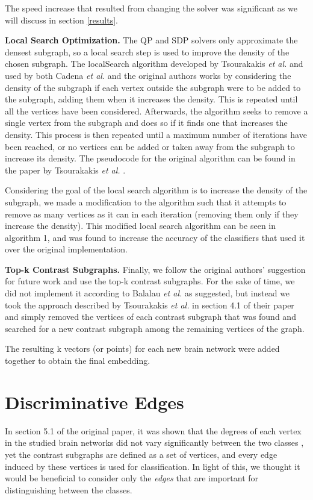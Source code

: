 \documentclass[letterpaper]{article}
\begin{document}
The speed increase that resulted from changing the solver was significant as we will discuss in section \ref{results}.

\textbf{Local Search Optimization.}
The QP and SDP solvers only approximate the densest subgraph, so a local search step is used to improve the density of the chosen subgraph.
The localSearch algorithm developed by Tsourakakis \emph{et al.} \cite{tsourakakis2013} and used by both Cadena \emph{et al.} and the original authors works by considering the density of the subgraph if each vertex outside the subgraph were to be added to the subgraph, adding them when it increases the density.
This is repeated until all the vertices have been considered.
Afterwards, the algorithm seeks to remove a single vertex from the subgraph and does so if it finds one that increases the density.
This process is then repeated until a maximum number of iterations have been reached, or no vertices can be added or taken away from the subgraph to increase its density.
The pseudocode for the original algorithm can be found in the paper by Tsourakakis \emph{et al.} \cite{tsourakakis2013}.

Considering the goal of the local search algorithm is to increase the density of the subgraph, we made a modification to the algorithm such that it attempts to remove as many vertices as it can in each iteration (removing them only if they increase the density).
This modified local search algorithm can be seen in algorithm 1, and was found to increase the accuracy of the classifiers that used it over the original implementation.

\textbf{Top-k Contrast Subgraphs.}
Finally, we follow the original authors' suggestion for future work and use the top-k contrast subgraphs.
For the sake of time, we did not implement it according to Balalau \emph{et al.} \cite{balalau2015} as suggested, but instead we took the approach described by Tsourakakis \emph{et al.} in section 4.1 of their paper \cite{tsourakakis2013} and simply removed the vertices of each contrast subgraph that was found and searched for a new contrast subgraph among the remaining vertices of the graph.

The resulting k vectors (or points) for each new brain network were added together to obtain the final embedding.



\section{Discriminative Edges}
In section 5.1 of the original paper, it was shown that the degrees of each vertex in the studied brain networks did not vary significantly between the two classes \cite{lanciano2020}, yet the contrast subgraphs are defined as a set of vertices, and every edge induced by these vertices is used for classification.
In light of this, we thought it would be beneficial to consider only the \emph{edges} that are important for distinguishing between the classes.
\end{document}
